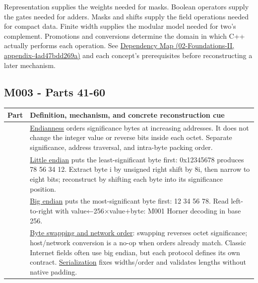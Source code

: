Representation supplies the weights needed for masks. Boolean operators supply the gates needed for adders. Masks and shifts supply the field operations needed for compact data. Finite width supplies the modular model needed for two's complement. Promotions and conversions determine the domain in which C++ actually performs each operation. See \href{}{Dependency Map (02-Foundations-II, appendix-4ad47bdd269a)} and each concept's prerequisites before reconstructing a later mechanism.

\subsection{M003 - Parts 41-60}\label{m003---parts-41-60}

{\def\LTcaptype{none} %
\begin{longtable}[]{@{}
  >{\raggedright\arraybackslash}p{}
  >{\raggedright\arraybackslash}p{}@{}}
\toprule\noalign{}
\begin{minipage}[b]{\linewidth}\raggedright
Part
\end{minipage} & \begin{minipage}[b]{\linewidth}\raggedright
Definition, mechanism, and concrete reconstruction cue
\end{minipage} \\
\midrule\noalign{}
\endhead
\bottomrule\noalign{}
\endlastfoot
41 & \hyperref[appendix-bc07c3d25b18]{Endianness} orders significance bytes at increasing addresses. It does not change the integer value or reverse bits inside each octet. Separate significance, address traversal, and intra-byte packing order. \\
42 & \hyperref[appendix-367b6abf460e]{Little endian} puts the least-significant byte first: 0x12345678 produces 78 56 34 12. Extract byte i by unsigned right shift by 8i, then narrow to eight bits; reconstruct by shifting each byte into its significance position. \\
43 & \hyperref[appendix-92e040df969a]{Big endian} puts the most-significant byte first: 12 34 56 78. Read left-to-right with value←256×value+byte: M001 Horner decoding in base 256. \\
44 & \hyperref[appendix-11ba36693aa2]{Byte swapping and network order}: swapping reverses octet significance; host/network conversion is a no-op when orders already match. Classic Internet fields often use big endian, but each protocol defines its own contract. \hyperref[appendix-91d09ebed979]{Serialization} fixes widths/order and validates lengths without native padding. \\

\end{longtable}}
